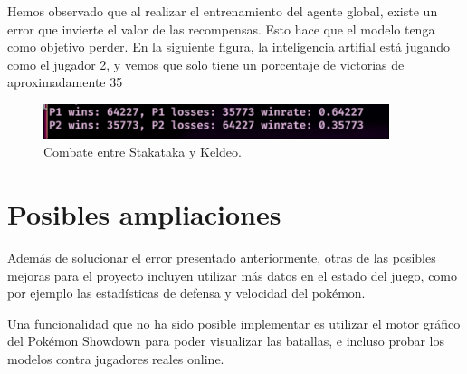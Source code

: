 Hemos observado que al realizar el entrenamiento del agente global, existe un error que invierte el valor de las recompensas. Esto hace que el modelo tenga como objetivo perder. En la siguiente figura, la inteligencia artifial está jugando como el jugador 2, y vemos que solo tiene un porcentaje de victorias de aproximadamente 35%

\begin{figure}[H]
    \centering
    \includegraphics[width=0.9\textwidth]{figures/test_agente_global.jpeg}
    \caption{Combate entre Stakataka y Keldeo.}
    \label{fig:turn}
\end{figure}

\section{Posibles ampliaciones}

Además de solucionar el error presentado anteriormente, otras de las posibles mejoras para el proyecto incluyen utilizar más datos en el estado del juego, como por ejemplo las estadísticas de defensa y velocidad del pokémon. 

Una funcionalidad que no ha sido posible implementar es utilizar el motor gráfico del Pokémon Showdown para poder visualizar las batallas, e incluso probar los modelos contra jugadores reales online.
